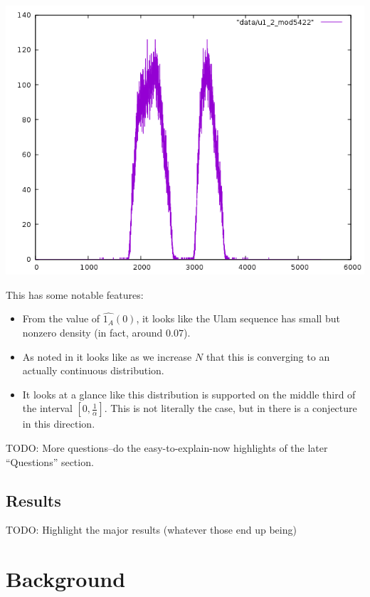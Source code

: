 \documentclass{article}
\theoremstyle{definition}
\theoremstyle{remark}
\numberwithin{equation}{section}
\begin{document}
\includegraphics[scale=0.5]{../figs/u1_2_mod5422.png}

This has some notable features: 

\begin{itemize}
\item From the value of $\widehat{1_A}(0)$, it looks like the Ulam
  sequence has small but nonzero density (in fact, around $0.07$).

\item As noted in \cite{steinerberger:preprint} it looks like as we increase $N$
  that this is converging to an actually continuous distribution.

\item It looks at a glance like this distribution is supported on the
  middle third of the interval $[0,\frac1\alpha]$.  This is not
  literally the case, but in \cite{gibbs:preprint} there is a
  conjecture in this direction.

\end{itemize}

{\color{red}

TODO: More questions--do the easy-to-explain-now highlights of the
later ``Questions'' section.

\subsection{Results}

TODO: Highlight the major results (whatever those end up being)

}
\section{Background}
\end{document}
